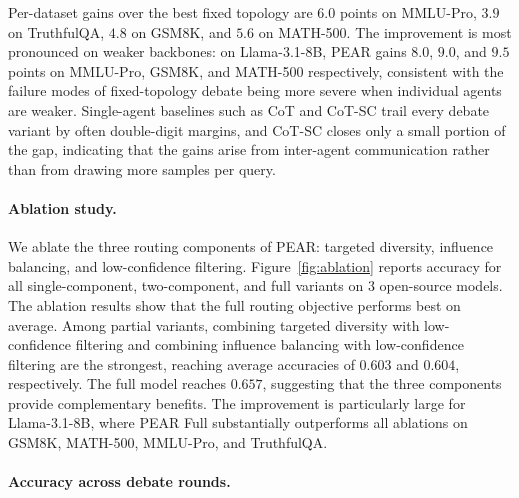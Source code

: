 Per-dataset gains over the best fixed topology are $6.0$ points on MMLU-Pro, $3.9$ on TruthfulQA, $4.8$ on GSM8K, and $5.6$ on MATH-500. The improvement is most pronounced on weaker backbones: on Llama-3.1-8B, PEAR gains $8.0$, $9.0$, and $9.5$ points on MMLU-Pro, GSM8K, and MATH-500 respectively, consistent with the failure modes of fixed-topology debate being more severe when individual agents are weaker. Single-agent baselines such as CoT and CoT-SC trail every debate variant by often double-digit margins, and CoT-SC closes only a small portion of the gap, indicating that the gains arise from inter-agent communication rather than from drawing more samples per query.



\paragraph{Ablation study.}
We ablate the three routing components of PEAR: targeted diversity, influence balancing, and low-confidence filtering. Figure~\ref{fig:ablation} reports accuracy for all single-component, two-component, and full variants on 3 open-source models.
The ablation results show that the full routing objective performs best on average. Among partial variants, combining targeted diversity with low-confidence filtering and combining influence balancing with low-confidence filtering are the strongest, reaching average accuracies of $0.603$ and $0.604$, respectively. The full model reaches $0.657$, suggesting that the three components provide complementary benefits. The improvement is particularly large for Llama-3.1-8B, where PEAR Full substantially outperforms all ablations on GSM8K, MATH-500, MMLU-Pro, and TruthfulQA.

 
\paragraph{Accuracy across debate rounds.}

